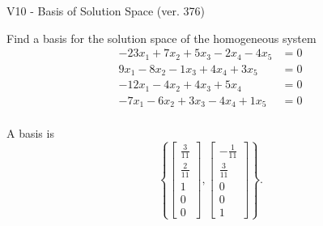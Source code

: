 \begin{exercise}
  \begin{exerciseTitle}V10 - Basis of Solution Space (ver. 376)\end{exerciseTitle}
  \begin{exerciseStatement}
    Find a basis for the solution space of the homogeneous system 
\begin{align*}
 -23 x_ 1 + 7 x_ 2 + 5 x_ 3 -2 x_ 4 -4 x_ 5 &= 0  \\ 
  9 x_ 1 -8 x_ 2 -1 x_ 3 + 4 x_ 4 + 3 x_ 5 &= 0  \\ 
  -12 x_ 1 -4 x_ 2 + 4 x_ 3 + 5 x_ 4 &= 0  \\ 
  -7 x_ 1 -6 x_ 2 + 3 x_ 3 -4 x_ 4 + 1 x_ 5 &= 0  \\ 
 \end{align*}


 
  \end{exerciseStatement}

  \begin{exerciseAnswer}
   A basis is   
\[\left\{\left[\begin{array}{c}
\frac{3}{11} \\
\frac{2}{11} \\
1 \\
0 \\
0
\end{array}\right] , \left[\begin{array}{c}
-\frac{1}{11} \\
\frac{3}{11} \\
0 \\
0 \\
1
\end{array}\right]\right\}.\]

  


  \end{exerciseAnswer}
\end{exercise}